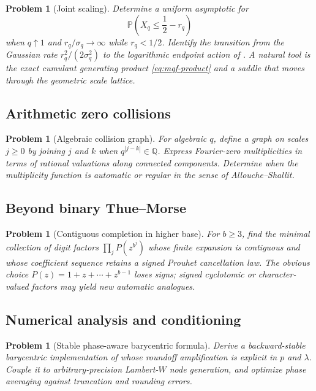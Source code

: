\documentclass[11pt,oneside]{article}
\newtheorem{problem}[theorem]{Problem}
\theoremstyle{definition}
\theoremstyle{remark}
\newcommand{\Q}{\mathbb Q}
\newcommand{\Prob}{\mathbb P}
\begin{document}
\begin{problem}[Joint scaling]
Determine a uniform asymptotic for
\[
 \Prob\!\left(X_q\le\frac12-r_q\right)
\]
when $q\uparrow1$ and $r_q/\sigma_q\to\infty$ while $r_q<1/2$.  Identify the transition from
the Gaussian rate $r_q^2/(2\sigma_q^2)$ to the logarithmic endpoint action of
.  A natural tool is the exact cumulant generating product
\eqref{eq:mgf-product} and a saddle that moves through the geometric scale lattice.
\end{problem}

\subsection{Arithmetic zero collisions}

\begin{problem}[Algebraic collision graph]
For algebraic $q$, define a graph on scales $j\ge0$ by joining $j$ and $k$ when
$q^{|j-k|}\in\Q$.  Express Fourier-zero multiplicities in terms of rational valuations along
connected components.  Determine when the multiplicity function is automatic or regular in
the sense of Allouche--Shallit.
\end{problem}

\subsection{Beyond binary Thue--Morse}

\begin{problem}[Contiguous completion in higher base]
For $b\ge3$, find the minimal collection of digit factors
\(
 \prod_j P(z^{b^j})
\)
whose finite expansion is contiguous and whose coefficient sequence retains a signed
Prouhet cancellation law.  The obvious choice
$P(z)=1+z+\cdots+z^{b-1}$ loses signs; signed cyclotomic or character-valued factors may yield
new automatic analogues.
\end{problem}

\subsection{Numerical analysis and conditioning}

\begin{problem}[Stable phase-aware barycentric formula]
Derive a backward-stable barycentric implementation of  whose
roundoff amplification is explicit in $p$ and $\lambda$.  Couple it to arbitrary-precision
Lambert-$W$ node generation, and optimize phase averaging against truncation and rounding
errors.
\end{problem}
\end{document}
